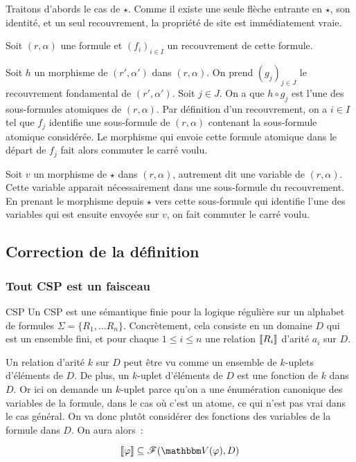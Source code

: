 \begin{pv}
    Traitons d'abords le cas de $\star$. Comme il existe une seule flèche
    entrante en $\star$, son identité, et un seul recouvrement, la propriété de
    site est immédiatement vraie.

    Soit $(r,\alpha)$ une formule et $(f_i)_{i\in I}$ un recouvrement de cette formule.
    
    Soit $h$ un morphisme de $(r', \alpha')$ dans $(r,\alpha)$. On prend
    $(g_j)_{j\in J}$ le recouvrement fondamental de $(r', \alpha')$. Soit $j\in
    J$. On a que $h\circ g_j$ est l'une des sous-formules atomiques de
    $(r,\alpha)$. Par définition d'un recouvrement, on a $i\in I$ tel que $f_j$
    identifie une sous-formule de $(r,\alpha)$ contenant la sous-formule
    atomique considérée. Le morphisme qui envoie cette formule atomique dans le
    départ de $f_j$ fait alors commuter le carré voulu.

    Soit $v$ un morphisme de $\star$ dans $(r,\alpha)$, autrement dit une
    variable de $(r,\alpha)$.  Cette variable apparait nécessairement dans une
    sous-formule du recouvrement. En prenant le morphisme depuis $\star$ vers
    cette sous-formule qui identifie l'une des variables qui est ensuite
    envoyée sur $v$, on fait commuter le carré voulu.
\end{pv}

\subsection{Correction de la définition}

\subsubsection{Tout CSP est un faisceau}

\begin{defi}{CSP}
    Un CSP est une sémantique finie pour la logique régulière sur un alphabet de formules 
    $\Sigma = \{R_1, \dots R_n\}$. Concrètement, cela consiste en un domaine $D$ qui est
    un ensemble fini, et pour chaque $1\leq i\leq n$ une relation $\llbracket {R_i} \rrbracket$
    d'arité $a_i$ sur $D$.
\end{defi}

\begin{rem}
    Un relation d'arité $k$ sur $D$ peut être vu comme un ensemble de $k$-uplets
    d'éléments de $D$. De plus, un $k$-uplet d'éléments de $D$ est une fonction de
    $k$ dans $D$. Or ici on demande un $k$-uplet parce qu'on a une énumération canonique
    des variables de la formule, dans le cas où c'est un atome, ce qui n'est pas vrai
    dans le cas général. On va donc plutôt considérer des fonctions des variables de
    la formule dans $D$. On aura alors~:

    \[ \sem{\phi}\subseteq \fns(\V(\phi), D) \]
\end{rem}

